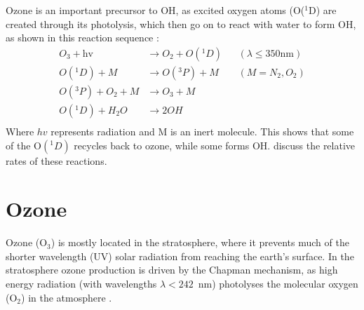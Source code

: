       Ozone is an important precursor to OH, as excited oxygen atoms (O(${}^1$D) are created through its photolysis, which then go on to react with water to form OH, as shown in this reaction sequence \citep{Atkinson2000, AtkinsonArey2003}:
      \begin{equation}
        \begin{aligned}
          O_3+\text{hv}     & \to  O_2 + O({}^1D)   && (\lambda \le 350 \text{nm}) \\%
          O({}^1D)+M        & \to  O({}^3P) + M     && (M=N_2, O_2)               \\%
          O({}^3P)+O_2 + M  & \to  O_3 + M          &&                           \\%
          O({}^1D)+H_2O     & \to  2OH              &&                            \\%
        \end{aligned}
        \label{LR:Atmos:Chem:eqn_O3toOH}
      \end{equation}
      Where $hv$ represents radiation and M is an inert molecule.
      This shows that some of the O$({}^1D)$ recycles back to ozone, while some forms OH.
      \cite{AtkinsonArey2003} discuss the relative rates of these reactions.

\section{Ozone}
\label{LR:O3}
  
  Ozone (O$_3$) is mostly located in the stratosphere, where it prevents much of the shorter wavelength (UV) solar radiation from reaching the earth's surface.
  In the stratosphere ozone production is driven by the Chapman mechanism, as high energy radiation (with wavelengths $\lambda<242$~nm) photolyses the molecular oxygen (O$_2$) in the atmosphere \citep[][Chapter 3, section 2]{BrasseurJacob2017}.
  
